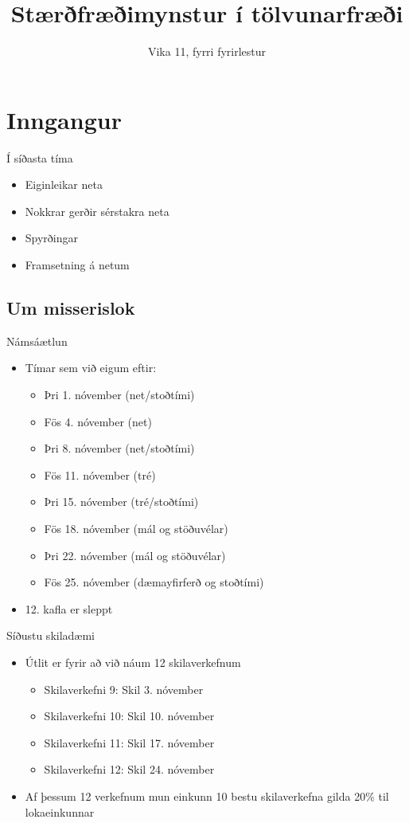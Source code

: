 \documentclass{beamer}
\title{Stærðfræðimynstur í tölvunarfræði}
\subtitle{Vika 11, fyrri fyrirlestur}
\begin{document}
\begin{frame}
\titlepage
\end{frame}


\section{Inngangur}

\begin{frame}{Í síðasta tíma}
\begin{itemize}
 \item Eiginleikar neta
 \item Nokkrar gerðir sérstakra neta
 \item Spyrðingar
 \item Framsetning á netum
\end{itemize}
\end{frame}

\subsection{Um misserislok}

\begin{frame}{Námsáætlun}
\begin{itemize}
 \item Tímar sem við eigum eftir:
 \begin{itemize}
  \item Þri 1. nóvember (net/stoðtími)
  \item Fös 4. nóvember (net)
  \item Þri 8. nóvember (net/stoðtími)
  \item Fös 11. nóvember (tré)
  \item Þri 15. nóvember (tré/stoðtími)
  \item Fös 18. nóvember (mál og stöðuvélar)
  \item Þri 22. nóvember (mál og stöðuvélar)
  \item Fös 25. nóvember (dæmayfirferð og stoðtími)
 \end{itemize}
 \item 12. kafla er sleppt
\end{itemize}

\end{frame}


\begin{frame}{Síðustu skiladæmi}
\begin{itemize}
 \item Útlit er fyrir að við náum 12 skilaverkefnum
 \begin{itemize}
  \item Skilaverkefni 9: Skil 3. nóvember
  \item Skilaverkefni 10: Skil 10. nóvember 
  \item Skilaverkefni 11: Skil 17. nóvember
  \item Skilaverkefni 12: Skil 24. nóvember
 \end{itemize}
 \item Af þessum 12 verkefnum mun einkunn 10 bestu skilaverkefna gilda 20\% til lokaeinkunnar
\end{itemize}
\end{frame}
\end{document}
